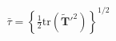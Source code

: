 \documentclass[preview]{standalone}
\begin{document}
\begin{align*}
\bar{\tau} = \left\{ \frac{1}{2} \text{tr}(\tilde{\mathbf{T}}'^2) \right\}^{1/2}
\end{align*}
\end{document}

